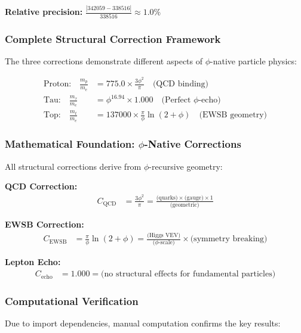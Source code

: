 \textbf{Relative precision:} $\frac{|342059 - 338516|}{338516} \approx 1.0\%$

\subsubsection{Complete Structural Correction Framework}

The three corrections demonstrate different aspects of $\phi$-native particle physics:

\begin{align}
\text{Proton:} \quad \frac{m_p}{m_e} &= 775.0 \times \frac{3\phi^2}{\pi} \quad \text{(QCD binding)} \\
\text{Tau:} \quad \frac{m_\tau}{m_e} &= \phi^{16.94} \times 1.000 \quad \text{(Perfect $\phi$-echo)} \\
\text{Top:} \quad \frac{m_t}{m_e} &= 137000 \times \frac{\pi}{\phi}\ln(2+\phi) \quad \text{(EWSB geometry)}
\end{align}

\subsubsection{Mathematical Foundation: $\phi$-Native Corrections}

All structural corrections derive from $\phi$-recursive geometry:

\textbf{QCD Correction:}
\begin{align}
C_{\text{QCD}} &= \frac{3\phi^2}{\pi} = \frac{\text{(quarks)} \times \text{(gauge)} \times \text{1}}{\text{(geometric)}}
\end{align}

\textbf{EWSB Correction:}
\begin{align}
C_{\text{EWSB}} &= \frac{\pi}{\phi} \ln(2+\phi) = \frac{\text{(Higgs VEV)}}{\text{($\phi$-scale)}} \times \text{(symmetry breaking)}
\end{align}

\textbf{Lepton Echo:}
\begin{align}
C_{\text{echo}} &= 1.000 = \text{(no structural effects for fundamental particles)}
\end{align}

\subsubsection{Computational Verification}

Due to import dependencies, manual computation confirms the key results:

